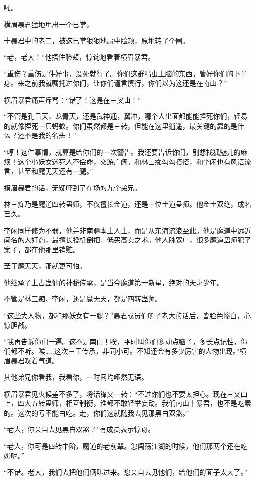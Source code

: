 \begin{this_body}
啪。

横眉暴君猛地甩出一个巴掌。

十暴君中的老二，被这巴掌狠狠地扇中脸颊，原地转了个圈。

“老，老大！”他捂住脸颊，惊诧地看着横眉暴君。

“重伤？重伤是件好事，没死就行了。你们这群精虫上脑的东西，管好你们的下半身。来之前我就嘱托过你们，让你们谨言慎行，你们以为这还是在南山？”

横眉暴君痛声斥骂：“错了！这是在三叉山！”

“不管是孔日天、龙青天，还是武神通，翼冲，哪个人出面都能能捏死你们，轻易的就像捏死一只蚂蚁。你们虽然都是三转，但能在这里逍遥，最关键的靠的是什么？还不是我的名头！”

“哼！这件事情，就算是给你们的一次警告。我还要告诉你们，别想找狐魅儿的麻烦！这个小妖女迷死人不偿命，交游广阔。和林三痴勾勾搭搭，和李闲也有风语流言，甚至和魔无天还有一腿。”

横眉暴君的话，无疑吓到了在场的九个弟兄。

林三痴乃是魔道四转蛊师，不仅擅长金道，还是一位土道蛊师。他金土双绝，成名已久。

李闲同样修为不弱，他并非南疆本土人士，而是从东海流浪至此。他是魔道中远近闻名的大奸商，最擅长投机倒把，低买高卖之术。他人脉宽广，很多魔道蛊师犯了案子，都在他那里销赃。

至于魔无天，那就更可怕。

他继承了上古蛊仙的神秘传承，是当今魔道第一新星，绝对的天才少年。

不管是林三痴、李闲，还是魔无天，都是四转蛊师。

“这些大人物，都和那妖女有一腿？”暴君成员们听了老大的话后，皆脸色惨白，心惊胆战。

“我再告诉你们一遍。这不是南山！唉，平时叫你们多动点脑子，多长点记性，你们都不听。唉……这次三王传承，非同小可。不知还会有多少厉害的人物出现。”横眉暴君叹着气道。

其他弟兄你看我，我看你，一时间均哑然无语。

横眉暴君见火候差不多了，将话锋又一转：“不过你们也不要太担心。现在三叉山上，四大五转蛊师，相互制衡，谁都不敢轻举妄动。我们南山十暴君，也不是吃素的。这次的亏不能白吃。走，你们这就随我去见那黑白双煞。”

“老大，你亲自去见黑白双煞？”有成员表示惊讶。

“老大，你可是四转中阶，魔道的老前辈。您闯荡江湖的时候，他们那两个还在吃奶呢。”

“不错。老大，我们去把他们俩叫过来。您亲自去见他们，给他们的面子太大了。”


\end{this_body}
